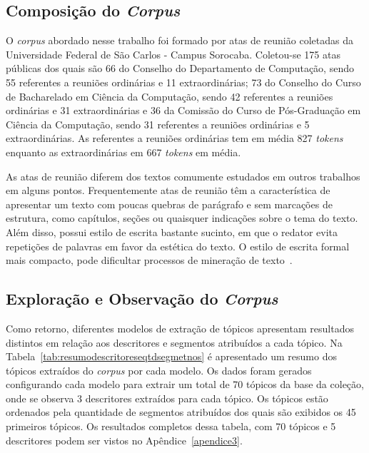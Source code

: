 \subsection{Composição do \textit{Corpus} }
\label{subsec:composicaocorpus}

O \textit{corpus} abordado nesse trabalho foi formado por atas de reunião coletadas da Universidade Federal de São Carlos - Campus Sorocaba. 
Coletou-se 175 atas públicas
dos quais são 
66 do Conselho do Departamento de Computação, sendo 55 referentes a reuniões ordinárias e 11 extraordinárias;
73 do Conselho do Curso de Bacharelado em Ciência da Computação, sendo 42 referentes a reuniões ordinárias e 31 extraordinárias e
36 da Comissão do Curso de Pós-Graduação em Ciência da Computação, sendo 31 referentes a reuniões ordinárias e 5 extraordinárias.
As referentes a reuniões ordinárias tem em média 827 \textit{tokens} enquanto as extraordinárias em 667 \textit{tokens} em média.

As atas de reunião diferem dos textos comumente estudados em outros trabalhos em alguns pontos. Frequentemente atas de reunião têm a característica de apresentar um texto com poucas quebras de parágrafo e sem marcações de estrutura, como capítulos, seções ou quaisquer indicações sobre o tema do texto. Além disso, possui estilo de escrita bastante sucinto, em que o redator evita repetições de palavras em favor da estética do texto. O estilo de escrita formal mais compacto, pode dificultar processos de mineração de texto~\cite{Choi2001-LSA}.  %








\subsection{Exploração e Observação do \textit{Corpus}}

Como retorno, diferentes modelos de extração de tópicos apresentam resultados distintos em relação aos descritores e segmentos atribuídos a cada tópico. Na Tabela~\ref{tab:resumodescritoreseqtdsegmetnos} é apresentado um resumo dos tópicos extraídos do \textit{corpus} por cada modelo. Os dados foram gerados configurando cada modelo para extrair um total de 70 tópicos da base da coleção, onde se observa 3 descritores extraídos para cada tópico. Os tópicos estão ordenados pela quantidade de segmentos atribuídos dos quais são exibidos os 45 primeiros tópicos. Os resultados completos dessa tabela, com 70 tópicos e 5 descritores podem ser vistos no Apêndice~\ref{apendice3}.



